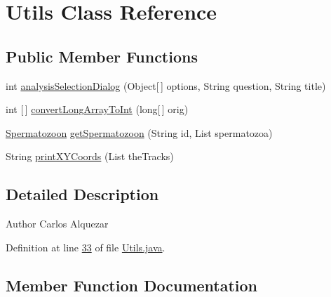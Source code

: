 \hypertarget{classfunctions_1_1_utils}{}\section{Utils Class Reference}
\label{classfunctions_1_1_utils}
\subsection*{Public Member Functions}
\begin{DoxyCompactItemize}
\item 
int \hyperlink{classfunctions_1_1_utils_a0e53c856e8bb35342f949c2f320d0e74}{analysis\+Selection\+Dialog} (Object\mbox{[}$\,$\mbox{]} options, String question, String title)
\item 
int \mbox{[}$\,$\mbox{]} \hyperlink{classfunctions_1_1_utils_af205010f6a95a6e41a837305446fd262}{convert\+Long\+Array\+To\+Int} (long\mbox{[}$\,$\mbox{]} orig)
\item 
\hyperlink{classdata_1_1_spermatozoon}{Spermatozoon} \hyperlink{classfunctions_1_1_utils_a3af2ec0eae0c2c19f7332e34197999bf}{get\+Spermatozoon} (String id, List spermatozoa)
\item 
String \hyperlink{classfunctions_1_1_utils_ab85218da3569b5a7c0b9749e7b2b747a}{print\+X\+Y\+Coords} (List the\+Tracks)
\end{DoxyCompactItemize}


\subsection{Detailed Description}
\begin{DoxyAuthor}{Author}
Carlos Alquezar 
\end{DoxyAuthor}


Definition at line \hyperlink{_utils_8java_source_l00033}{33} of file \hyperlink{_utils_8java_source}{Utils.\+java}.



\subsection{Member Function Documentation}
\hypertarget{classfunctions_1_1_utils_a0e53c856e8bb35342f949c2f320d0e74}{}\label{classfunctions_1_1_utils_a0e53c856e8bb35342f949c2f320d0e74} 
